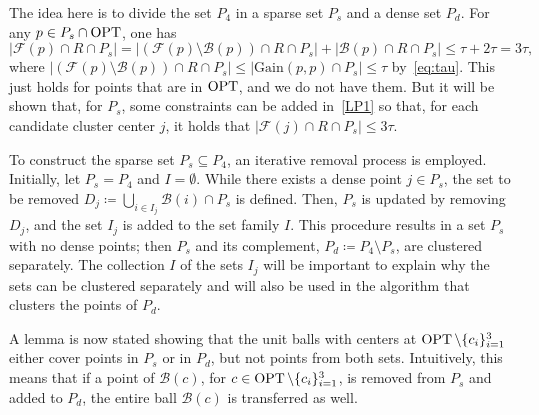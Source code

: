 The idea here is to divide the set $P_4$ in a sparse set $P_s$ and a dense set $P_d$. For any $p \in P_s \cap \operatorname{OPT}$, one has
\begin{equation}
    \label{bound_red_flower_opt}
|\mathcal{F}(p) \cap R \cap P_s| = |(\mathcal{F}(p) \setminus \mathcal{B}(p) ) \cap R \cap P_s | + |\mathcal{B}(p) \cap R \cap P_s| \leq \tau + 2\tau = 3\tau,
\end{equation}
where $|(\mathcal{F}(p) \setminus \mathcal{B}(p) ) \cap R \cap P_s | \leq |\mathrm{Gain}(p,p) \cap P_s| \leq \tau$ by~\eqref{eq:tau}.
This just holds for points that are in $\operatorname{OPT}$, and we do not have them. 
But it will be shown that, for $P_s$, some constraints can be added in~\ref{LP1} so that, for each candidate cluster center $j$, it holds that $|\mathcal{F}(j) \cap R \cap P_s| \leq 3\tau$.

To construct the sparse set $P_s \subseteq P_4$, an iterative removal process is employed. 
Initially, let $P_s = P_4$ and $I = \emptyset$. 
While there exists a dense point $j \in P_s$, the set to be removed $D_j \coloneqq \bigcup_{i \in I_j} \mathcal{B}(i) \cap P_s$ is defined. 
Then, $P_s$ is updated by removing $D_j$, and the set $I_j$ is added to the set family $I$. 
This procedure results in a set $P_s$ with no dense points; then $P_s$ and its complement, $P_d \coloneqq P_4 \setminus P_s$, are clustered separately. 
The collection $I$ of the sets $I_j$ will be important to explain why the sets can be clustered separately and will also be used in the algorithm that clusters the points of $P_d$.

A lemma is now stated showing that the unit balls with centers at $\operatorname{OPT} \setminus \{c_i\}_{i=1}^3$ either cover points in $P_s$ or in $P_d$, but not points from both sets. Intuitively, this means that if a point of $\mathcal{B}(c)$, for $c \in \operatorname{OPT} \setminus \{c_i\}_{i=1}^3$, is removed from $P_s$ and added to $P_d$, the entire ball $\mathcal{B}(c)$ is transferred as well.

